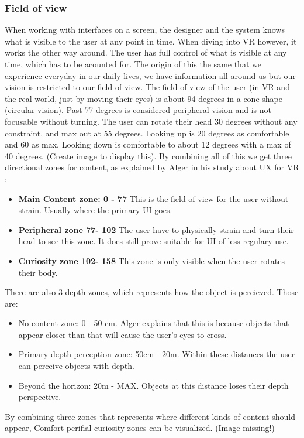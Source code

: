 \subsubsection{Field of view}
When working with interfaces on a screen, the designer and the system knows what is visible to the user at any point in time. When diving into VR however, it works the other way around. The user has full control of what is visible at any time, which has to be acounted for. The origin of this the same that we experience everyday in our daily lives, we have information all around us but our vision is restricted to our field of view. The field of view of the user (in VR and the real world, just by moving their eyes) is about 94 degrees in a cone shape (circular vision). Past 77 degrees is considered peripheral vision and is not focusable without turning. The user can rotate their head 30 degrees without any constraint, and max out at 55 degrees. Looking up is 20 degrees as comfortable and 60 as max. Looking down is comfortable to about 12 degrees with a max of 40 degrees. (Create image to display this). By combining all of this we get three directional zones for content, as explained by Alger in his study about UX for VR \cite{UX:Alger2015}:
\begin{itemize}
  \item \textbf{Main Content zone: 0 - 77\degree} This is the field of view for the user without strain. Usually where the primary UI goes.
  \item \textbf{Peripheral zone 77\degree - 102\degree} The user have to physically strain and turn their head to see this zone. It does still prove suitable for UI of less regulary use.
  \item \textbf{Curiosity zone 102\degree - 158\degree} This zone is only visible when the user rotates their body.
\end{itemize}
There are also 3 depth zones, which represents how the object is percieved. Those are:
\begin{itemize}
\item No content zone: 0 - 50 cm. Alger explains that this is because objects that appear closer than that will cause the user's eyes to cross.
\item Primary depth perception zone: 50cm - 20m. Within these distances the user can perceive objects with depth.
\item Beyond the horizon: 20m - MAX. Objects at this distance loses their depth perspective.
\end{itemize}
By combining three zones that represents where different kinds of content should appear,  Comfort-perifial-curiosity zones can be visualized. \cite{UX:Alger2015} (Image missing!)
